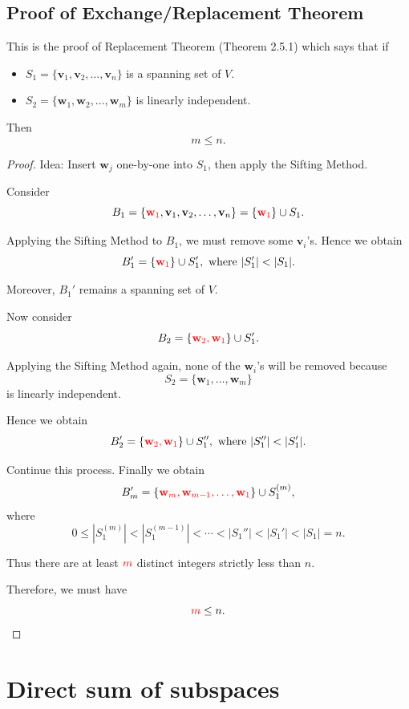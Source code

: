 \documentclass[12pt]{article}
\begin{document}
\newpage

\subsection{Proof of Exchange/Replacement Theorem}
This is the proof of Replacement Theorem (Theorem 2.5.1) which says that if
\begin{itemize}
    \item
    $S_1=\{\mathbf{v}_1,\mathbf{v}_2,\ldots,\mathbf{v}_n\}$ is a spanning set of $V$.

    \item
    $S_2=\{\mathbf{w}_1,\mathbf{w}_2,\ldots,\mathbf{w}_m\}$ is linearly independent.
\end{itemize}

Then
\[
m\le n.
\]

\begin{proof}
Idea: Insert $\mathbf{w}_j$ one-by-one into $S_1$, then apply the Sifting Method.

Consider
\[
B_1
=
\{\textcolor{red}{\mathbf{w}_1},\mathbf{v}_1,\mathbf{v}_2,\ldots,\mathbf{v}_n\}
=
\{\textcolor{red}{\mathbf{w}_1}\}\cup S_1.
\]

Applying the Sifting Method to $B_1$, we must remove some $\mathbf{v}_i$'s. Hence we obtain
\[
B_1' =\{\textcolor{red}{\mathbf{w}_1}\}\cup S_1', \text{ where } |S_1'|<|S_1|.
\]

Moreover, $B_1'$ remains a spanning set of $V$.

Now consider
\[
B_2 = \{\textcolor{red}{\mathbf{w}_2,\mathbf{w}_1}\}\cup S_1'.
\]

Applying the Sifting Method again, none of the $\mathbf{w}_i$'s will be removed because
\[
S_2 = \{\mathbf{w}_1,\ldots,\mathbf{w}_m\}
\]
is linearly independent.

Hence we obtain
\[
B_2' = \{\textcolor{red}{\mathbf{w}_2,\mathbf{w}_1}\}\cup S_1'', \text{ where } |S_1''|<|S_1'|.
\]

Continue this process. Finally we obtain
\[
B_m' = \{\textcolor{red}{\mathbf{w}_m,\mathbf{w}_{m-1},\ldots,\mathbf{w}_1}\} \cup S_1^{(m)},
\]
where
\[
0 \le |S_1^{(m)}| < |S_1^{(m-1)}| < \cdots < |S_1''| < |S_1'| < |S_1| = n.
\]

Thus there are at least $\textcolor{red}{m}$ distinct integers strictly less than $n$. 

Therefore, we must have
\[
\textcolor{red}{m}\le n.
\]
\end{proof}

\section{Direct sum of subspaces}
\end{document}

